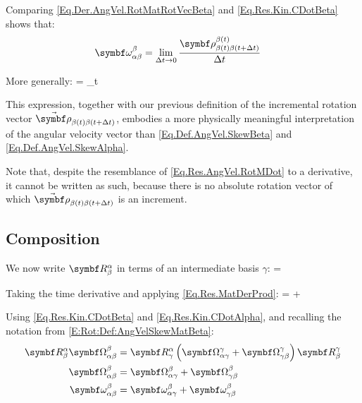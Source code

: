 Comparing \eqref{Eq.Der.AngVel.RotMatRotVecBeta} and \eqref{Eq.Res.Kin.CDotBeta} shows that:
\begin{align*}
\angvel{\alpha}{\beta}{\beta} &= \lim_{\Delta t\to 0} \frac{\rotv[\beta(t)]{\beta(t)}{\beta(t+\Delta t)}}{\Delta t}
\end{align*}

More generally:
{
\varel{\angvelsymb}{\alpha}{\beta} = \lim_{\Delta t} 
}

This expression, together with our previous definition of the incremental rotation vector $\varel{\rotvecsymb}{\beta(t)}{\beta(t+\Delta t)}$, embodies a more physically meaningful interpretation of the angular velocity vector than \eqref{Eq.Def.AngVel.SkewBeta} and \eqref{Eq.Def.AngVel.SkewAlpha}.

Note that, despite the resemblance of \eqref{Eq.Res.AngVel.RotMDot} to a derivative, it cannot be written as such, because there is no absolute rotation vector of which $\varel{\rotvecsymb}{\beta(t)}{\beta(t+\Delta t)}$ is an increment.

\subsection{Composition} %

We now write $\RotM{\alpha}{\beta}$ in terms of an intermediate basis $\gamma$:
\eqnl
{
\RotM{\alpha}{\beta} = \RotM{\alpha}{\gamma} \RotM{\gamma}{\beta}
}

Taking the time derivative and applying \eqref{Eq.Res.MatDerProd}:
\eql{}
{
\RotMDot{\alpha}{\beta} 	= \RotMDot{\alpha}{\gamma} \RotM{\gamma}{\beta} + \RotM{\alpha}{\gamma} \RotMDot{\gamma}{\beta}
}

Using \eqref{Eq.Res.Kin.CDotBeta} and \eqref{Eq.Res.Kin.CDotAlpha}, and recalling the notation from \eqref{E:Rot:Def:AngVelSkewMatBeta}:
\begin{equation} \label{Eq.Res.OmegaCompBeta}
\begin{aligned}
\RotM{\alpha}{\beta} \AngVelSkew{\alpha}{\beta}{\beta} 	&=  \RotM{\alpha}{\gamma} \rndp{\AngVelSkew{\alpha}{\gamma}{\gamma} + \AngVelSkew{\gamma}{\beta}{\gamma}} \RotM{\gamma}{\beta} \\
\AngVelSkew{\alpha}{\beta}{\beta}				&= \AngVelSkew{\alpha}{\gamma}{\beta} + \AngVelSkew{\gamma}{\beta}{\beta} \\
\angvel{\alpha}{\beta}{\beta} 					&= \angvel{\alpha}{\gamma}{\beta} + \angvel{\gamma}{\beta}{\beta}
\end{aligned}
\end{equation}


